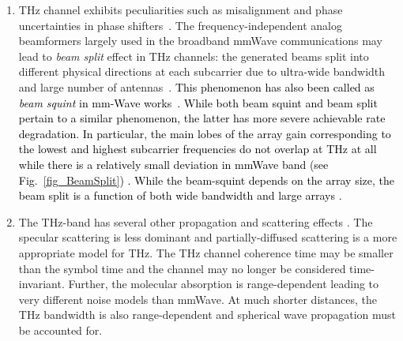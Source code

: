 \documentclass[journal,10pt]{IEEEtran}
\begin{document}
{\begin{enumerate}
			\item THz channel exhibits peculiarities such as misalignment and phase uncertainties in phase shifters~\cite{teraMIMO}. The frequency-independent analog beamformers largely used in the broadband mmWave communications may lead to \textit{beam split} effect in THz channels: the generated beams split into different physical directions at each subcarrier due to ultra-wide bandwidth and large number of antennas~\cite{thz_beamSplit}. \textcolor{black}{This phenomenon has also been called as \emph{beam squint} in mm-Wave works~\cite{beamSquintGaoMagazine,beamSquintWang2019Nov}. While both beam squint and beam split pertain to a similar phenomenon, the latter has more severe achievable rate degradation. In particular, the main lobes of the array gain corresponding to the lowest and highest subcarrier frequencies do not overlap at THz at all while there is a relatively small deviation in mmWave band (see Fig.~\ref{fig_BeamSplit}) \cite{beamSplitDai2021Feb,thz_beamSplitConf}. While the beam-squint depends on the array size, the beam split is a function of both wide bandwidth and large arrays \cite{beamSplitDai2021Feb}.}
			\item The THz-band has several other propagation and scattering effects \cite{teraMIMO}. The specular scattering is less dominant and partially-diffused scattering is a more appropriate model for THz. The THz channel coherence time may be smaller than the symbol time and the channel may no longer be considered time-invariant. Further, the molecular absorption is range-dependent leading to very different noise models than mmWave. At much shorter distances, the THz bandwidth is also range-dependent and spherical wave propagation must be accounted for.
		\end{enumerate}
		
		
	}
	
	
	
	
	
\end{document}
